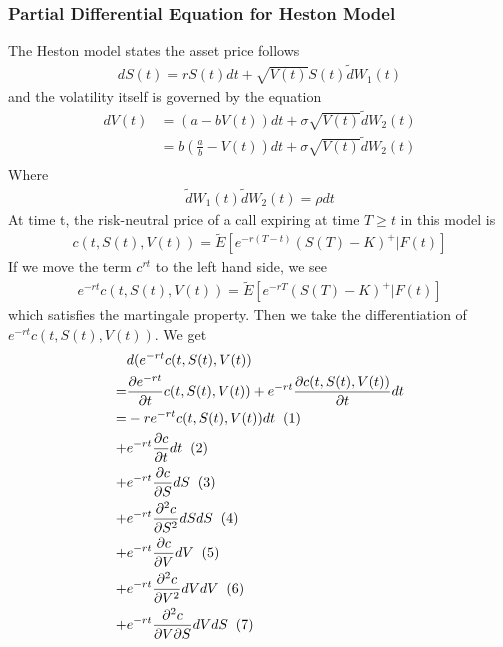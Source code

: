 \documentclass[a4paper]{article}
\begin{document}
\subsubsection{Partial Differential Equation for Heston Model} 
The Heston model states the asset price follows
\begin{align}
	dS(t) = rS(t)dt + \sqrt{V(t)} S(t) \tilde dW_1(t)
\end{align}
and the volatility itself is governed by the equation
\begin{align}
	dV(t) & = (a -bV(t))dt + \sigma \sqrt{V(t)} \tilde dW_2(t) \\
	      & = b(\frac{a}{b} -V(t))dt + \sigma \sqrt{V(t)} \tilde dW_2(t) \\
\end{align}
Where 
\begin{align*}
	\tilde dW_1(t) \tilde dW_2(t) = \rho dt
\end{align*}
At time t, the risk-neutral price of a call expiring at time $T \geq t$ in this model is
\begin{align*}
	c(t, S(t), V(t)) = \tilde E[e^{-r(T-t)}(S(T)-K)^+|F(t)]
\end{align*}
If we move the term $c^{rt}$ to the left hand side, we see
\begin{align}
	e^{-rt}c(t, S(t), V(t)) = \tilde E[e^{-rT}(S(T)-K)^+|F(t)]
\end{align}
which satisfies the martingale property.
Then we take the differentiation of $e^{-rt}c(t, S(t), V(t))$. We get
\begin{align*}
	& d(e^{-rt}c(t, S(t), V(t))\\
	= & \frac{\partial e^{-rt}}{\partial t} c(t, S(t), V(t)) 
	+ e^{-rt}\frac{\partial c(t, S(t), V(t))}{\partial t} dt \\
	= & -re^{-rt}c(t, S(t),V(t))dt \hspace{2mm} (1)\\
	+ & e^{-rt} \frac{\partial c}{\partial t} dt \hspace{2mm} (2) \\
	+ & e^{-rt} \frac{\partial c}{\partial S} dS \hspace{2mm} (3) \\
	+ & e^{-rt} \frac{\partial^2 c}{\partial S^2} dS dS \hspace{2mm} (4)\\
	+ & e^{-rt} \frac{\partial c}{\partial V} dV \hspace{2mm} (5) \\
	+ & e^{-rt} \frac{\partial^2 c}{\partial V^2} dV dV\hspace{2mm} (6)\\
	+ & e^{-rt} \frac{\partial^2 c}{\partial V \partial S} dV dS\hspace{2mm} (7)
\end{align*}
\end{document}

